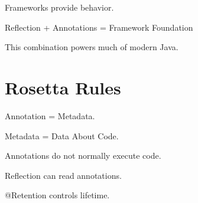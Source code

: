 \documentclass[11pt,a4paper]{book}
\begin{document}
Frameworks provide behavior.


\begin{idea}

Reflection + Annotations = Framework Foundation


This combination powers
much of modern Java.

\end{idea}


\section{Rosetta Rules}

\begin{rosettarule}

Annotation = Metadata.

\end{rosettarule}


\begin{rosettarule}

Metadata = Data About Code.

\end{rosettarule}


\begin{rosettarule}

Annotations do not normally
execute code.

\end{rosettarule}


\begin{rosettarule}

Reflection can read annotations.

\end{rosettarule}


\begin{rosettarule}

@Retention controls lifetime.

\end{rosettarule}
\end{document}

